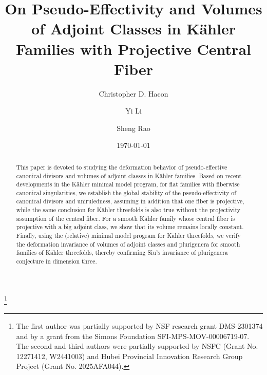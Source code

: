 \documentclass[12pt]{amsart}
\numberwithin{equation}{section}
\theoremstyle{definition}
\theoremstyle{plain}
\newtheorem*{thm A*}{Theorem A}
\newtheorem*{thm B*}{Theorem B}
\newtheorem*{thm C*}{Theorem C}
\newtheorem*{thm D*}{Theorem D}
\theoremstyle{definition}
\renewcommand{\1}{\mathds{1}}
\renewcommand{\>}{\rightarrow}
\begin{document}
\title{On Pseudo-Effectivity and Volumes of Adjoint Classes in K\"ahler Families with Projective Central Fiber}


\begin{abstract}
This paper is devoted to studying the deformation behavior of pseudo-effective canonical divisors and volumes of adjoint classes in K\"ahler families. Based on recent developments in the K\"ahler minimal model program, for flat families with fiberwise canonical singularities, we establish the global stability of the pseudo-effectivity of canonical divisors and uniruledness, assuming in addition that one fiber is projective, while the same conclusion for K\"ahler threefolds is also true without the projectivity assumption of the central fiber.  For a smooth K\"ahler family whose central fiber is projective with a big adjoint class, we show that its volume remains locally constant. Finally, using the (relative) minimal model program for K\"ahler threefolds, we verify the deformation invariance of volumes of adjoint classes and plurigenera for smooth families of K\"ahler threefolds, thereby confirming Siu’s invariance of plurigenera conjecture in dimension three.
\end{abstract}
	
	\author{Christopher D. Hacon}
	\address{Department of Mathematics, University of Utah, Salt Lake City, UT 84112,
USA}
 \author{Yi Li}
    \address{Department of Mathematics, Wuhan University, Hubei, Wuhan 430074, China}
    \author{Sheng Rao}
    \address{Department of Mathematics, Wuhan University, Hubei, Wuhan 430074, China}
	\date{\today}
	\thanks{The first author was partially supported by  NSF research grant   DMS-2301374 and
by a grant from the Simons Foundation SFI-MPS-MOV-00006719-07. The second and third authors were partially supported by NSFC (Grant No. 12271412, W2441003) and Hubei Provincial Innovation Research Group Project (Grant No. 2025AFA044).}
	
	\maketitle
	\setcounter{tocdepth}{1}
	\tableofcontents

\end{document}
